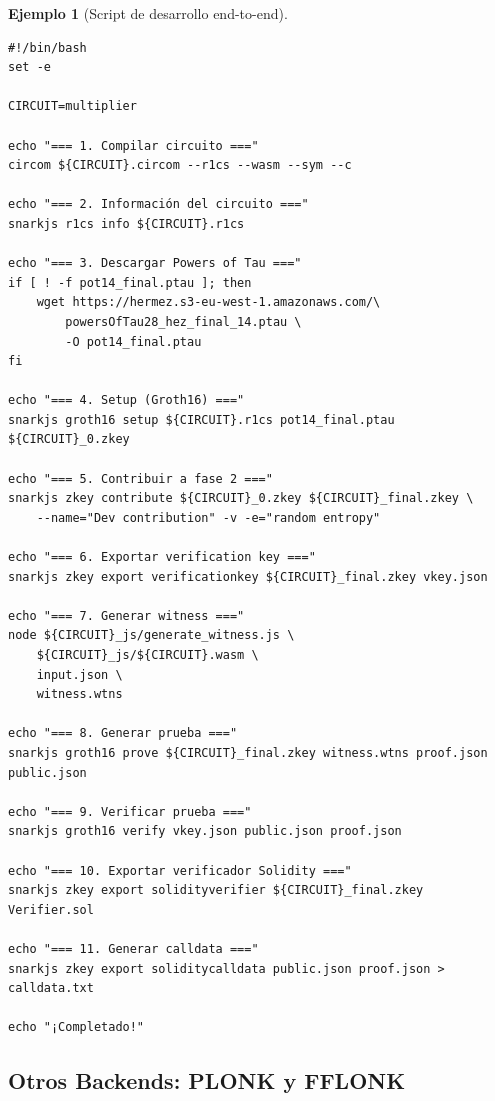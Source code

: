 \documentclass[11pt,a4paper,twoside,openright]{book}
\theoremstyle{definition}
\newtheorem{example}{Ejemplo}[chapter]
\theoremstyle{plain}
\theoremstyle{remark}
\begin{document}
\begin{example}[Script de desarrollo end-to-end]
\begin{verbatim}
#!/bin/bash
set -e

CIRCUIT=multiplier

echo "=== 1. Compilar circuito ==="
circom ${CIRCUIT}.circom --r1cs --wasm --sym --c

echo "=== 2. Información del circuito ==="
snarkjs r1cs info ${CIRCUIT}.r1cs

echo "=== 3. Descargar Powers of Tau ==="
if [ ! -f pot14_final.ptau ]; then
    wget https://hermez.s3-eu-west-1.amazonaws.com/\
        powersOfTau28_hez_final_14.ptau \
        -O pot14_final.ptau
fi

echo "=== 4. Setup (Groth16) ==="
snarkjs groth16 setup ${CIRCUIT}.r1cs pot14_final.ptau ${CIRCUIT}_0.zkey

echo "=== 5. Contribuir a fase 2 ==="
snarkjs zkey contribute ${CIRCUIT}_0.zkey ${CIRCUIT}_final.zkey \
    --name="Dev contribution" -v -e="random entropy"

echo "=== 6. Exportar verification key ==="
snarkjs zkey export verificationkey ${CIRCUIT}_final.zkey vkey.json

echo "=== 7. Generar witness ==="
node ${CIRCUIT}_js/generate_witness.js \
    ${CIRCUIT}_js/${CIRCUIT}.wasm \
    input.json \
    witness.wtns

echo "=== 8. Generar prueba ==="
snarkjs groth16 prove ${CIRCUIT}_final.zkey witness.wtns proof.json public.json

echo "=== 9. Verificar prueba ==="
snarkjs groth16 verify vkey.json public.json proof.json

echo "=== 10. Exportar verificador Solidity ==="
snarkjs zkey export solidityverifier ${CIRCUIT}_final.zkey Verifier.sol

echo "=== 11. Generar calldata ==="
snarkjs zkey export soliditycalldata public.json proof.json > calldata.txt

echo "¡Completado!"
\end{verbatim}
\end{example}

\subsection{Otros Backends: PLONK y FFLONK}
\end{document}
